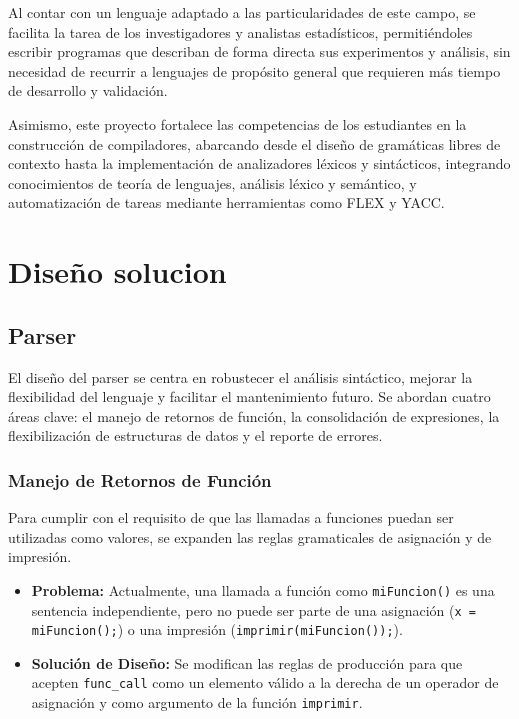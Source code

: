 \documentclass{article}
\begin{document}
Al contar con un lenguaje adaptado a las particularidades de este campo, se facilita la tarea de los investigadores y analistas estadísticos, permitiéndoles escribir programas que describan de forma directa sus experimentos y análisis, sin necesidad de recurrir a lenguajes de propósito general que requieren más tiempo de desarrollo y validación.

Asimismo, este proyecto fortalece las competencias de los estudiantes en la construcción de compiladores, abarcando desde el diseño de gramáticas libres de contexto hasta la implementación de analizadores léxicos y sintácticos, integrando conocimientos de teoría de lenguajes, análisis léxico y semántico, y automatización de tareas mediante herramientas como FLEX y YACC.

\section{Diseño solucion}

\subsection{Parser}

El diseño del parser se centra en robustecer el análisis sintáctico, mejorar la flexibilidad del lenguaje y facilitar el mantenimiento futuro. Se abordan cuatro áreas clave: el manejo de retornos de función, la consolidación de expresiones, la flexibilización de estructuras de datos y el reporte de errores.


\subsubsection{Manejo de Retornos de Función}
Para cumplir con el requisito de que las llamadas a funciones puedan ser utilizadas como valores, se expanden las reglas gramaticales de asignación y de impresión.

\begin{itemize}
    \item \textbf{Problema:} Actualmente, una llamada a función como \texttt{miFuncion()} es una sentencia independiente, pero no puede ser parte de una asignación (\texttt{x = miFuncion();}) o una impresión (\texttt{imprimir(miFuncion());}).
    
    \item \textbf{Solución de Diseño:} Se modifican las reglas de producción para que acepten \texttt{func\_call} como un elemento válido a la derecha de un operador de asignación y como argumento de la función \texttt{imprimir}.
\end{itemize}
\end{document}
